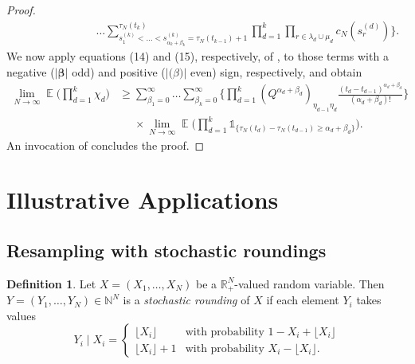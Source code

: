 \documentclass{article}
\theoremstyle{definition}
\newtheorem{definition}{Definition}
\DeclareMathOperator{\E}{\mathbb{E}}
\newcommand{\1}[1]{\mathbbm{1}_{\{#1\}}}
\begin{document}
\begin{proof}
\begin{align*}
&\phantom{\geq \times \lim_{ N \rightarrow \infty } \E\Bigg[} \ldots \sum_{ s_1^{ ( k ) } < \ldots < s_{ \alpha_k + \beta_k }^{ ( k ) } = \tau_N( t_{ k - 1 } ) + 1 }^{ \tau_N( t_k ) } \prod_{ d = 1 }^k \prod_{ r \in \lambda_d \cup \mu_d } c_N( s_r^{ ( d ) } ) \Bigg\}.
\end{align*}
We now apply equations (14) and (15), respectively, of \citet{koskela2018},  to those terms with a negative ($|\bm{\beta}|$ odd) and positive ($|\bm(\beta)|$ even) sign, respectively, and obtain
\begin{align*}
\lim_{ N \rightarrow \infty } \E\Bigg( \prod_{ d = 1 }^k \chi_d \Bigg) 
&\geq \sum_{ \beta_1 = 0 }^{ \infty } \ldots \sum_{ \beta_k = 0 }^{ \infty } \Bigg\{ \prod_{ d = 1 }^k ( Q^{ \alpha_d + \beta_d } )_{ \eta_{ d - 1 } \eta_d } \frac{ ( t_d - t_{ d - 1 } )^{ \alpha_d + \beta_d } }{ ( \alpha_d + \beta_d ) ! } \Bigg\} \\
&\phantom{\geq} \times \lim_{ N \rightarrow \infty } \E\Bigg( \prod_{ d = 1 }^k \mathds{ 1 }_{ \{ \tau_N( t_d ) - \tau_N( t_{ d - 1 } ) \geq \alpha_d + \beta_d \} } \Bigg).
\end{align*}
An invocation of \citet[Eq (16)]{koskela2018} concludes the proof.
\end{proof}


\section{Illustrative Applications}\label{sec:applications}
\subsection{Resampling with stochastic roundings}
\begin{definition}\label{defn:stochround}
 Let $X=(X_1,\dots,X_N)$ be a $\mathbb{R}_+^N$-valued random variable. Then $Y=(Y_1,\dots,Y_N) \in \mathbb{N}^N$ is a \emph{stochastic rounding} of $X$ if each element $Y_i$ takes values
\begin{equation*}
Y_i \mid X_i =
\begin{cases}
 \lfloor X_i \rfloor & \text{with probability } 1- X_i+ \lfloor X_i \rfloor \\
  \lfloor X_i \rfloor +1 & \text{with probability } X_i- \lfloor X_i \rfloor .
\end{cases}
\end{equation*}
\end{definition}
\end{document}

